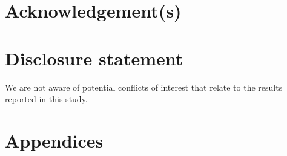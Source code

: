 \documentclass[]{interact}
\begin{document}
%

%

%

%

%

%


\section*{Acknowledgement(s)}


\section*{Disclosure statement}

We are not aware of potential conflicts of interest that relate to the results reported in this study.



\newpage





\newpage
\section{Appendices}

\appendix
\end{document}
